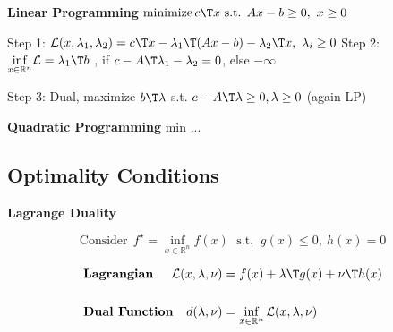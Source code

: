 
\textbf{Linear Programming}
$ \operatorname{minimize} c\T x
	\text{ s.t. } Ax-b \ge 0,\ x\ge0$

Step 1:
$\mathcal{L}(x,\lambda_1,\lambda_2) =
	c\T x-\lambda_1\T (Ax-b) -\lambda_2\T x,\ \lambda_i \ge0$
Step 2:
$\underset{x \in \mathcal{\mathbb{R}}^n}{\operatorname{inf}}
	\mathcal{L}=\lambda_1\T b$
, if $c-A\T\lambda_1-\lambda_2=0$, else $-\infty$

Step 3: Dual,
maximize $b\T\lambda$
s.t.
$c-A\T\lambda\ge0,\lambda\ge0$
(again LP)

\textbf{Quadratic Programming}
min ...

\subsection{Optimality Conditions}

\begin{sstTitleBox}{\center\textbf{\large
			Lagrange Duality
		}}
	\begin{centering}
		\begin{sstOnlyFrame}
			\vspace{-1.5mm}
			\[ \text{Consider}\ \
				f^\star = \inf_{x\in\mathcal{\mathbb{R}}^n}f(x)
				\;\text{ s.t. }\ g(x)\le0,\ h(x)=0
				\label{eq:dual}%
			\]
		\end{sstOnlyFrame}


		\begin{sstFrame}
			{\color{white}
				\vspace{-2mm}
				\[\begin{aligned}
						 & \textbf{Lagrangian}
						 & \hspace{-4mm}	\mathcal{L}(x,\lambda,\nu)
						 & = f(x) + \lambda\T g(x)+\nu\T h(x)
						\\
						\\
						 & \textbf{Dual Function}
						 & \hspace{-4mm}		d(\lambda,\nu)            & = \inf_{x \in \mathcal{\mathbb{R}}^n}\mathcal{L}(x,\lambda,\nu)
					\end{aligned}\]
				\vspace{-2.7mm}
			}
		\end{sstFrame}
	\end{centering}
\end{sstTitleBox}


